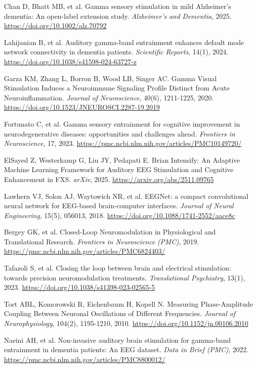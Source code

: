 \documentclass[11pt,letterpaper]{article}
\begin{document}
\begin{enumerate}[label={[\arabic*]}, leftmargin=2em, itemsep=2pt, parsep=0pt]
\item Chan D, Bhatt MB, et al. Gamma sensory stimulation in mild Alzheimer's dementia: An open-label extension study. \textit{Alzheimer's and Dementia}, 2025. \url{https://doi.org/10.1002/alz.70792}
\item Lahijanian B, et al. Auditory gamma-band entrainment enhances default mode network connectivity in dementia patients. \textit{Scientific Reports}, 14(1), 2024. \url{https://doi.org/10.1038/s41598-024-63727-z}
\item Garza KM, Zhang L, Borron B, Wood LB, Singer AC. Gamma Visual Stimulation Induces a Neuroimmune Signaling Profile Distinct from Acute Neuroinflammation. \textit{Journal of Neuroscience}, 40(6), 1211-1225, 2020. \url{https://doi.org/10.1523/JNEUROSCI.2287-19.2019}
\item Fortunato C, et al. Gamma sensory entrainment for cognitive improvement in neurodegenerative diseases: opportunities and challenges ahead. \textit{Frontiers in Neuroscience}, 17, 2023. \url{https://pmc.ncbi.nlm.nih.gov/articles/PMC10149720/}
\item ElSayed Z, Westerkamp G, Liu JY, Pedapati E. Brian Intensify: An Adaptive Machine Learning Framework for Auditory EEG Stimulation and Cognitive Enhancement in FXS. \textit{arXiv}, 2025. \url{https://arxiv.org/abs/2511.09765}
\item Lawhern VJ, Solon AJ, Waytowich NR, et al. EEGNet: a compact convolutional neural network for EEG-based brain-computer interfaces. \textit{Journal of Neural Engineering}, 15(5), 056013, 2018. \url{https://doi.org/10.1088/1741-2552/aace8c}
\item Bergey GK, et al. Closed-Loop Neuromodulation in Physiological and Translational Research. \textit{Frontiers in Neuroscience (PMC)}, 2019. \url{https://pmc.ncbi.nlm.nih.gov/articles/PMC6824403/}
\item Tafazoli S, et al. Closing the loop between brain and electrical stimulation: towards precision neuromodulation treatments. \textit{Translational Psychiatry}, 13(1), 2023. \url{https://doi.org/10.1038/s41398-023-02565-5}
\item Tort ABL, Komorowski R, Eichenbaum H, Kopell N. Measuring Phase-Amplitude Coupling Between Neuronal Oscillations of Different Frequencies. \textit{Journal of Neurophysiology}, 104(2), 1195-1210, 2010. \url{https://doi.org/10.1152/jn.00106.2010}
\item Naeini AH, et al. Non-invasive auditory brain stimulation for gamma-band entrainment in dementia patients: An EEG dataset. \textit{Data in Brief (PMC)}, 2022. \url{https://pmc.ncbi.nlm.nih.gov/articles/PMC8800012/}
\end{enumerate}
\end{document}
